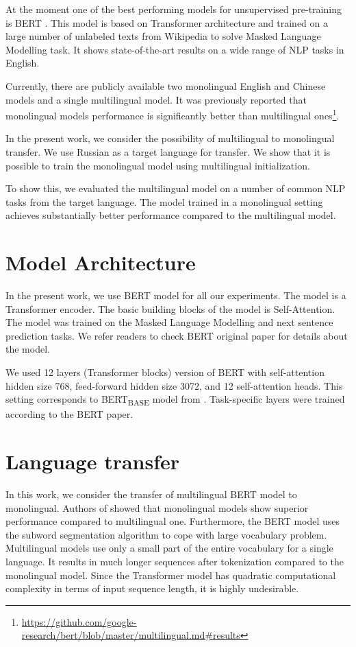 \documentclass{article}
\begin{document}
At the moment one of the best performing models for unsupervised pre-training is BERT \cite{devlin2018bert}. This model is based on Transformer \cite{vaswani2017attention} architecture and trained on a large number of unlabeled texts from Wikipedia to solve Masked Language Modelling task. It shows state-of-the-art results on a wide range of NLP tasks in English. 

Currently, there are publicly available two monolingual English and Chinese models and a single multilingual model. It was previously reported that monolingual models performance is significantly better than multilingual ones\footnote{\url{https://github.com/google-research/bert/blob/master/multilingual.md\#results}}. 

In the present work, we consider the possibility of multilingual to monolingual transfer. We use Russian as a target language for transfer. We show that it is possible to train the monolingual model using multilingual initialization.

To show this, we evaluated the multilingual model on a number of common NLP tasks from the target language. The model trained in a monolingual setting achieves substantially better performance compared to the multilingual model.

\section{Model Architecture}

In the present work, we use BERT \cite{devlin2018bert} model for all our experiments. The model is a Transformer \cite{vaswani2017attention} encoder. The basic building blocks of the model is Self-Attention. The model was trained on the Masked Language Modelling and next sentence prediction tasks. We refer readers to check BERT original paper for details about the model\cite{devlin2018bert}. 

We used 12 layers (Transformer blocks) version of BERT with self-attention hidden size 768, feed-forward hidden size 3072, and 12 self-attention heads. This setting corresponds to BERT\textsubscript{BASE} model from \cite{devlin2018bert}. Task-specific layers were trained according to the BERT paper.

\section{Language transfer}

In this work, we consider the transfer of multilingual BERT model to monolingual. Authors of \cite{devlin2018bert} showed that monolingual models show superior performance compared to multilingual one. 
Furthermore, the BERT model uses the subword segmentation algorithm\cite{sennrich2015subwordnmt} to cope with large vocabulary problem. Multilingual models use only a small part of the entire vocabulary for a single language. It results in much longer sequences after tokenization compared to the monolingual model. Since the Transformer model has quadratic computational complexity in terms of input sequence length, it is highly undesirable.
\end{document}
